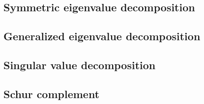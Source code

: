 \subsection{Symmetric eigenvalue decomposition}


\subsection{Generalized eigenvalue decomposition}

\subsection{Singular value decomposition}

\subsection{Schur complement}
